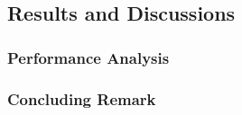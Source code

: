 \subsection{Results and Discussions}

\subsubsection{Performance Analysis}
\subsubsection{Concluding Remark}